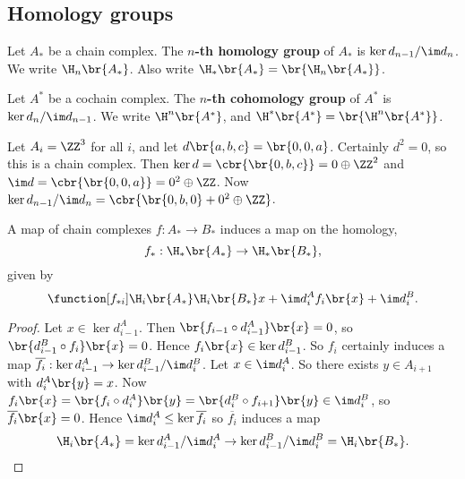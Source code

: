 \subsection{Homology groups}

\begin{definition}
Let $ A_* $ be a chain complex. The \textbf{$ n $-th homology group} of $ A_* $ is $ \ker d_{n - 1} / \im d_n $. We write $ \H_n\br{A_*} $. Also write $ \H_*\br{A_*} = \br{\H_n\br{A_*}} $.
\end{definition}

\begin{definition}
Let $ A^* $ be a cochain complex. The \textbf{$ n $-th cohomology group} of $ A^* $ is $ \ker d_n / \im d_{n - 1} $. We write $ \H^n\br{A^*} $, and $ \H^*\br{A^*} = \br{\H^n\br{A^*}} $.
\end{definition}

\begin{example*}
Let $ A_i = \ZZ^3 $ for all $ i $, and let $ d\br{a, b, c} = \br{0, 0, a} $. Certainly $ d^2 = 0 $, so this is a chain complex. Then $ \ker d = \cbr{\br{0, b, c}} = 0 \oplus \ZZ^2 $ and $ \im d = \cbr{\br{0, 0, a}} = 0^2 \oplus \ZZ $. Now $ \ker d_{n - 1} / \im d_n = \cbr{\br{0, b, 0} + 0^2 \oplus \ZZ} $.
\end{example*}

\begin{proposition}
A map of chain complexes $ f : A_* \to B_* $ induces a map on the homology,
$$ f_* : \H_*\br{A_*} \to \H_*\br{B_*}, $$
given by
$$ \function[f_{*i}]{\H_i\br{A_*}}{\H_i\br{B_*}}{x + \im d_i^A}{f_i\br{x} + \im d_i^B}. $$
\end{proposition}

\begin{proof}
Let $ x \in \ker d_{i - 1}^A $. Then $ \br{f_{i - 1} \circ d_{i - 1}^A}\br{x} = 0 $, so $ \br{d_{i - 1}^B \circ f_i}\br{x} = 0 $. Hence $ f_i\br{x} \in \ker d_{i - 1}^B $. So $ f_i $ certainly induces a map $ \overline{f_i} : \ker d_{i - 1}^A \to \ker d_{i - 1}^B / \im d_i^B $. Let $ x \in \im d_i^A $. So there exists $ y \in A_{i + 1} $ with $ d_i^A\br{y} = x $. Now $ f_i\br{x} = \br{f_i \circ d_i^A}\br{y} = \br{d_i^B \circ f_{i + 1}}\br{y} \in \im d_i^B $, so $ \overline{f_i}\br{x} = 0 $. Hence $ \im d_i^A \le \ker \overline{f_i} $ so $ \overline{f_i} $ induces a map
$$ \H_i\br{A_*} = \ker d_{i - 1}^A / \im d_i^A \to \ker d_{i - 1}^B / \im d_i^B = \H_i\br{B_*}. $$
\end{proof}

\pagebreak

